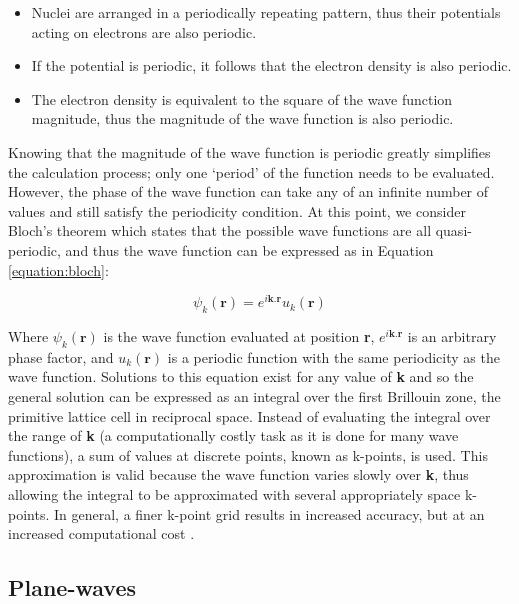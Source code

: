 \begin{itemize}

\item Nuclei are arranged in a periodically repeating pattern, thus their potentials acting on electrons are also periodic.

\item If the potential is periodic, it follows that the electron density is also periodic.

\item The electron density is equivalent to the square of the wave function magnitude, thus the magnitude of the wave function is also periodic.

\end{itemize}

Knowing that the magnitude of the wave function is periodic greatly simplifies the calculation process; only one `period' of the function needs to be evaluated. However, the phase of the wave function can take any of an infinite number of values and still satisfy the periodicity condition. At this point, we consider Bloch's theorem which states that the possible wave functions are all quasi-periodic, and thus the wave function can be expressed as in Equation \ref{equation:bloch}:  %

\begin{equation}
\label{equation:bloch}
\psi_k(\textbf{r}) = e^{i\textbf{k}.\textbf{r}}u_k(\textbf{r})
\end{equation}

Where $\psi_k(\textbf{r})$ is the wave function evaluated at position \textbf{r}, $e^{i\textbf{k}.\textbf{r}}$ is an arbitrary phase factor, and $u_k(\textbf{r})$ is a periodic function with the same periodicity as the wave function. Solutions to this equation exist for any value of \textbf{k} and so the general solution can be expressed as an integral over the first Brillouin zone, the primitive lattice cell in reciprocal space. Instead of evaluating the integral over the range of \textbf{k} (a computationally costly task as it is done for many wave functions), a sum of values at discrete points, known as k-points, is used. This approximation is valid because the wave function varies slowly over \textbf{k}, thus allowing the integral to be approximated with several appropriately space k-points. In general, a finer k-point grid results in increased accuracy, but at an increased computational cost \cite{Hasnip2010}.

\subsection{Plane-waves}

